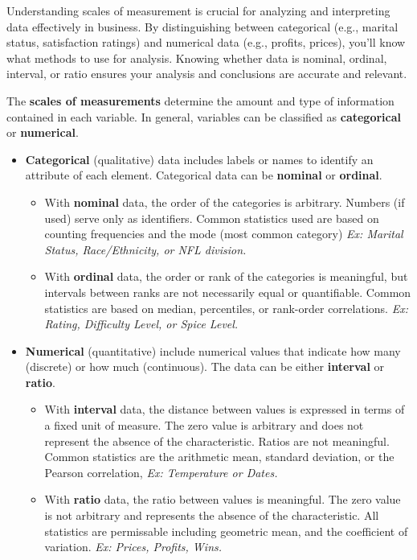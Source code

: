 \documentclass[
  11pt,
  letterpaper,
  DIV=11,
  numbers=noendperiod,
  oneside,
  open=any]{scrreprt}
\begin{document}
Understanding scales of measurement is crucial for analyzing and
interpreting data effectively in business. By distinguishing between
categorical (e.g., marital status, satisfaction ratings) and numerical
data (e.g., profits, prices), you'll know what methods to use for
analysis. Knowing whether data is nominal, ordinal, interval, or ratio
ensures your analysis and conclusions are accurate and relevant.

The \textbf{scales of measurements} determine the amount and type of
information contained in each variable. In general, variables can be
classified as \textbf{categorical} or \textbf{numerical}.

\begin{itemize}
\item
  \textbf{Categorical} (qualitative) data includes labels or names to
  identify an attribute of each element. Categorical data can be
  \textbf{nominal} or \textbf{ordinal}.

  \begin{itemize}
  \item
    With \textbf{nominal} data, the order of the categories is
    arbitrary. Numbers (if used) serve only as identifiers. Common
    statistics used are based on counting frequencies and the mode (most
    common category) \emph{Ex: Marital Status, Race/Ethnicity, or NFL
    division.}
  \item
    With \textbf{ordinal} data, the order or rank of the categories is
    meaningful, but intervals between ranks are not necessarily equal or
    quantifiable. Common statistics are based on median, percentiles, or
    rank-order correlations. \emph{Ex: Rating, Difficulty Level, or
    Spice Level.}
  \end{itemize}
\item
  \textbf{Numerical} (quantitative) include numerical values that
  indicate how many (discrete) or how much (continuous). The data can be
  either \textbf{interval} or \textbf{ratio}.

  \begin{itemize}
  \item
    With \textbf{interval} data, the distance between values is
    expressed in terms of a fixed unit of measure. The zero value is
    arbitrary and does not represent the absence of the characteristic.
    Ratios are not meaningful. Common statistics are the arithmetic
    mean, standard deviation, or the Pearson correlation, \emph{Ex:
    Temperature or Dates.}
  \item
    With \textbf{ratio} data, the ratio between values is meaningful.
    The zero value is not arbitrary and represents the absence of the
    characteristic. All statistics are permissable including geometric
    mean, and the coefficient of variation. \emph{Ex: Prices, Profits,
    Wins.}
  \end{itemize}
\end{itemize}
\end{document}
